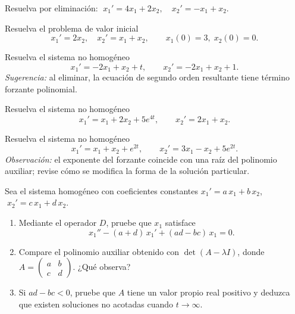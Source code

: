 \begin{exercise}[\est{1}]\label{ex:B3}
Resuelva por eliminación: $\;x_1' = 4x_1 + 2x_2, \quad x_2' = -x_1 + x_2.$
\end{exercise}

\begin{exercise}[\est{2}]\label{ex:B4}
Resuelva el problema de valor inicial
\[
x_1' = 2x_2, \quad x_2' = x_1 + x_2, \qquad x_1(0) = 3,\; x_2(0) = 0.
\]
\end{exercise}

\begin{exercise}[\est{2}]\label{ex:B5}
Resuelva el sistema no homogéneo
\[
x_1' = -2x_1 + x_2 + t, \qquad x_2' = -2x_1 + x_2 + 1.
\]
\emph{Sugerencia:} al eliminar, la ecuación de segundo orden resultante tiene término forzante polinomial.
\end{exercise}

\begin{exercise}[\est{2}]\label{ex:B6}
Resuelva el sistema no homogéneo
\[
x_1' = x_1 + 2x_2 + 5e^{4t}, \qquad x_2' = 2x_1 + x_2.
\]
\end{exercise}

\begin{exercise}[\est{3}]\label{ex:B7}
Resuelva el sistema no homogéneo
\[
x_1' = x_1 + x_2 + e^{2t}, \qquad x_2' = 3x_1 - x_2 + 5e^{2t}.
\]
\emph{Observación:} el exponente del forzante coincide con una raíz del polinomio auxiliar; revise cómo se modifica la forma de la solución particular.
\end{exercise}

\begin{exercise}[\est{3}]\label{ex:B8}
Sea el sistema homogéneo con coeficientes constantes $x_1' = a\,x_1 + b\,x_2$, $\;x_2' = c\,x_1 + d\,x_2$.
\begin{enumerate}[a]
    \item Mediante el operador $D$, pruebe que $x_1$ satisface
    \[
        x_1'' - (a+d)\,x_1' + (ad - bc)\,x_1 = 0.
    \]
    \item Compare el polinomio auxiliar obtenido con $\det(A - \lambda I)$, donde $A = \begin{pmatrix} a & b\\ c & d\end{pmatrix}$. ¿Qué observa?
    \item Si $ad - bc < 0$, pruebe que $A$ tiene un valor propio real positivo y deduzca que existen soluciones no acotadas cuando $t \to \infty$.
\end{enumerate}
\end{exercise}

